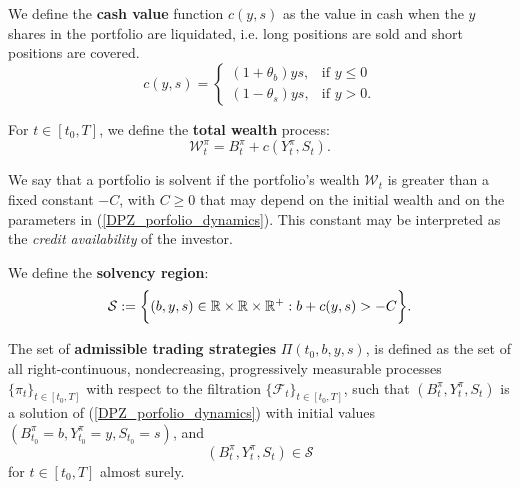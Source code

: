 \begin{Definition}
We define the \textbf{cash value} function $c(y,s)$ as the value in cash when the $y$ shares in the portfolio are liquidated, i.e.  
long positions are sold and short positions are covered.
\begin{equation}\label{cost_function}
c(y,s) = \begin{cases} 
(1+\theta_b)ys, & \mbox{if } y\leq 0 \\ 
(1-\theta_s)ys, & \mbox{if } y>0 . 
\end{cases} 
\end{equation} 
\end{Definition}
\begin{Definition}
For $t\in [t_0,T]$, we define the \textbf{total wealth} process:
\begin{equation}\label{wealth_process}
 \mathcal{W}^{\pi}_t = B^{\pi}_t + c(Y^{\pi}_t,S_t).
\end{equation} 
\end{Definition}
We say that a portfolio is solvent if the portfolio's wealth $\mathcal{W}_t$ is greater than a fixed constant $-C$, with 
$C\geq0$ that may depend on the initial wealth and on the parameters in (\ref{DPZ_porfolio_dynamics}). 
This constant may be interpreted as the \emph{credit availability} of the investor.
\begin{Definition}
We define the \textbf{solvency region}:
\begin{equation}\label{solvency_region}
 \mathcal{S} := \biggl\{ (b,y,s) \in \mathbb{R} \times \mathbb{R} \times \mathbb{R}^+ : b + c(y,s) > -C  \biggr\}.
\end{equation} 
\end{Definition}
\begin{Definition}\label{admissible_strategies1}
The set of \textbf{admissible trading strategies} $\Pi(t_0,b,y,s)$, is defined   
as the set of all right-continuous, nondecreasing, progressively measurable processes  
$\{\pi_t\}_{t \in [t_0,T]}$ with respect to the filtration $\{\mathcal{F}_t\}_{t \in [t_0,T]}$, 
such that $(B^\pi_t,Y^\pi_t,S_t)$ is a solution of (\ref{DPZ_porfolio_dynamics}) with initial values $(B^\pi_{t_0} = b, Y^\pi_{t_0} = y, S_{t_0} = s)$, 
and 
\begin{equation}
 (B^\pi_t,Y^\pi_t,S_t) \in \mathcal{S}
\end{equation}
for $t \in [t_0,T]$ almost surely.
\end{Definition}





